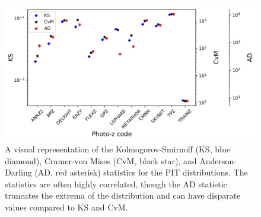 \documentclass[usenatbib]{mn2e}
\newcommand{\red}[1]{\textcolor{red}{#1}}
\newcommand{\aim}[1]{\textcolor{green}{#1}}%
\begin{document}
\begin{figure}
\centering
\includegraphics[width=\textwidth]{figures/KSvsCvMvsAD_PIT_withnull_jpg.jpg}
\caption{A visual representation of the Kolmogorov-Smirnoff (KS, blue diamond), Cramer-von Mises (CvM, black star), and Anderson-Darling (AD, red asterisk) statistics for the PIT distributions.  The statistics are often highly correlated, though the AD statistic truncates the extrema of the distribution and can have disparate values compared to KS and CvM.} \label{fig:pit_stats}
\end{figure}
\end{document}
